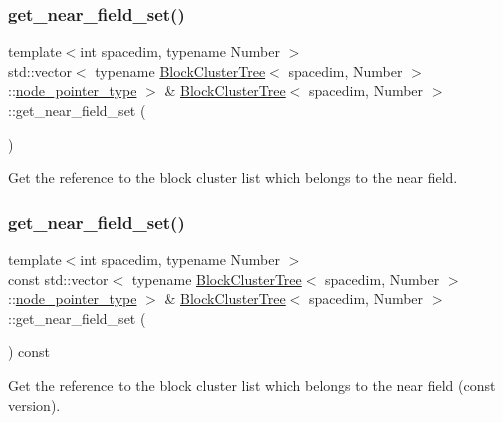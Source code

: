\subsubsection{\texorpdfstring{get\+\_\+near\+\_\+field\+\_\+set()}{get\_near\_field\_set()}\hspace{0.1cm}{\footnotesize\ttfamily [1/2]}}
{\footnotesize\ttfamily template$<$int spacedim, typename Number $>$ \\
std\+::vector$<$ typename \hyperlink{classBlockClusterTree}{Block\+Cluster\+Tree}$<$ spacedim, Number $>$\+::\hyperlink{classTreeNode}{node\+\_\+pointer\+\_\+type} $>$ \& \hyperlink{classBlockClusterTree}{Block\+Cluster\+Tree}$<$ spacedim, Number $>$\+::get\+\_\+near\+\_\+field\+\_\+set (\begin{DoxyParamCaption}{ }\end{DoxyParamCaption})}

Get the reference to the block cluster list which belongs to the near field. \mbox{\label{classBlockClusterTree_a6ac71437177d14012c12f7b4f354cdd1}} 
\subsubsection{\texorpdfstring{get\+\_\+near\+\_\+field\+\_\+set()}{get\_near\_field\_set()}\hspace{0.1cm}{\footnotesize\ttfamily [2/2]}}
{\footnotesize\ttfamily template$<$int spacedim, typename Number $>$ \\
const std\+::vector$<$ typename \hyperlink{classBlockClusterTree}{Block\+Cluster\+Tree}$<$ spacedim, Number $>$\+::\hyperlink{classTreeNode}{node\+\_\+pointer\+\_\+type} $>$ \& \hyperlink{classBlockClusterTree}{Block\+Cluster\+Tree}$<$ spacedim, Number $>$\+::get\+\_\+near\+\_\+field\+\_\+set (\begin{DoxyParamCaption}{ }\end{DoxyParamCaption}) const}

Get the reference to the block cluster list which belongs to the near field (const version). \mbox{\label{classBlockClusterTree_a042e040d2f6dfcbbfd70b43b8967c6f6}} 
